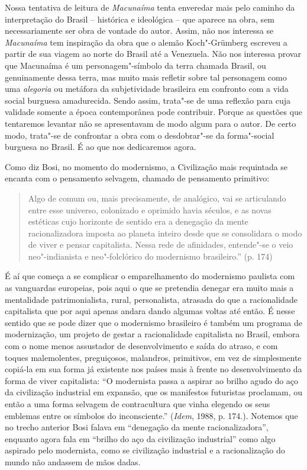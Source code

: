 Nossa tentativa de leitura de \emph{Macunaíma} tenta enveredar mais pelo
caminho da interpretação do Brasil -- histórica e ideológica -- que
aparece na obra, sem necessariamente ser obra de vontade do autor.
Assim, não nos interessa se \emph{Macunaíma} tem inspiração da obra que
o alemão Koch"-Grümberg escreveu a partir de sua viagem ao norte do
Brasil até a Venezuela. Não nos interessa provar que Macunaíma é um
personagem"-símbolo da terra chamada Brasil, ou genuinamente dessa terra,
mas muito mais refletir sobre tal personagem como uma \emph{alegoria} ou
metáfora da subjetividade brasileira em confronto com a vida social
burguesa amadurecida. Sendo assim, trata"-se de uma reflexão para cuja
validade somente a época contemporânea pode contribuir. Porque as
questões que tentaremos levantar não se apresentavam de modo algum para
o autor. De certo modo, trata"-se de confrontar a obra com o
desdobrar"-se da forma"-social burguesa no Brasil. É ao que nos
dedicaremos agora.

Como diz Bosi, no momento do modernismo, a Civilização mais requintada
se encanta com o pensamento selvagem, chamado de pensamento primitivo:

\begin{quote}
Algo de comum ou, mais precisamente, de analógico, vai se articulando
entre esse universo, colonizado e oprimido havia séculos, e as novas
estéticas cujo horizonte de sentido era a denegação da mente
racionalizadora imposta ao planeta inteiro desde que se consolidara o
modo de viver e pensar capitalista. Nessa rede de afinidades, entende"-se
o veio neo"-indianista e neo"-folclórico do modernismo brasileiro.'' (p.
174)
\end{quote}

É aí que começa a se complicar o emparelhamento do modernismo paulista
com as vanguardas europeias, pois aqui o que se pretendia denegar era
muito mais a mentalidade patrimonialista, rural, personalista, atrasada
do que a racionalidade capitalista que por aqui apenas andara dando
algumas voltas até então. É nesse sentido que se pode dizer que o
modernismo brasileiro é também um programa de modernização, um projeto
de gestar a racionalidade capitalista no Brasil, embora com o nome menos
assustador de desenvolvimento e saída do atraso, e com toques
malemolentes, preguiçosos, malandros, primitivos, em vez de simplesmente
copiá-la em sua forma já existente nos países mais à frente no
desenvolvimento da forma de viver capitalista: ``O modernista passa a
aspirar ao brilho agudo do aço da civilização industrial em expansão,
que os manifestos futuristas proclamam, ou então a uma forma selvagem de
contracultura que vinha elegendo os seus emblemas entre os símbolos do
inconsciente.'' (\emph{Idem}, 1988, p. 174.). Notemos que no trecho anterior
Bosi falava em ``denegação da mente racionalizadora'', enquanto agora
fala em ``brilho do aço da civilização industrial'' como algo aspirado
pelo modernista, como se civilização industrial e a racionalização do
mundo não andassem de mãos dadas.

